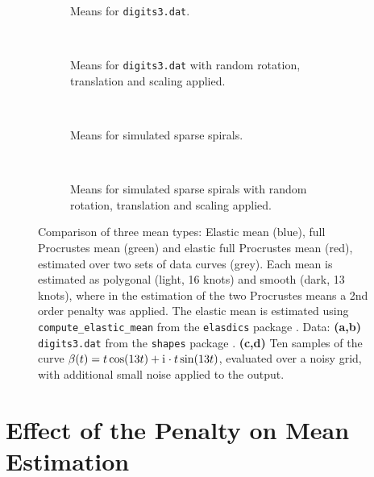 \begin{figure}
  \centering
  \begin{subfigure}{\textwidth}
    \centering
    \caption{Means for \texttt{digits3.dat}.}
    \label{fig:41-digit3-means-a}
  \end{subfigure}\vspace{0.66em}\\
  \begin{subfigure}{\textwidth}
    \centering
    \caption{Means for \texttt{digits3.dat} with random rotation, translation and scaling applied.}
    \label{fig:41-digit3-means-b}
  \end{subfigure}\vspace{0.66em}\\
  \begin{subfigure}{\textwidth}
    \centering
    \caption{Means for simulated sparse spirals.}
    \label{fig:41-means-a}
  \end{subfigure}\vspace{0.66em}\\
  \begin{subfigure}{\textwidth}
    \centering
    \caption{Means for simulated sparse spirals with random rotation, translation and scaling applied.}
    \label{fig:41-means-b}
  \end{subfigure}
  \caption{Comparison of three mean types: Elastic mean (blue), full Procrustes mean (green) and elastic full Procrustes mean (red), estimated over two sets of data curves (grey).
  Each mean is estimated as polygonal (light, 16 knots) and smooth (dark, 13 knots), where in the estimation of the two Procrustes means a 2nd order penalty was applied.
  The elastic mean is estimated using \texttt{compute\_elastic\_mean} from the \texttt{elasdics} package \parencite{elasdics}.
  Data: \textbf{(a,b)} \texttt{digits3.dat} from the \texttt{shapes} package \parencite{shapes}.
  \textbf{(c,d)} Ten samples of the curve $\beta(t) = t \cos(13t) + \mathrm{i}\mkern1mu \cdot t \sin(13t)$, evaluated over a noisy grid, with additional small noise applied to the output.}
  \label{fig:41-means}
\end{figure}


\section{Effect of the Penalty on Mean Estimation}
\label{sec:4-penalty}

